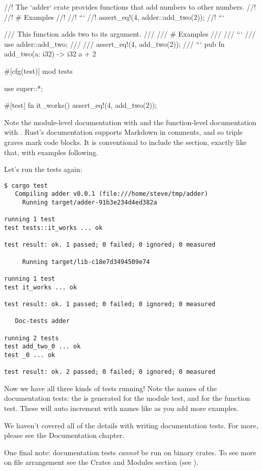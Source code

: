 \begin{rustc}
//! The `adder` crate provides functions that add numbers to other numbers.
//!
//! # Examples
//!
//! ```
//! assert_eq!(4, adder::add_two(2));
//! ```

/// This function adds two to its argument.
///
/// # Examples
///
/// ```
/// use adder::add_two;
///
/// assert_eq!(4, add_two(2));
/// ```
pub fn add_two(a: i32) -> i32 {
    a + 2
}

#[cfg(test)]
mod tests {
    use super::*;

    #[test]
    fn it_works() {
        assert_eq!(4, add_two(2));
    }
}
\end{rustc}

Note the module-level documentation with \code{//!} and the function-level documentation with \code{///}. Rust's documentation 
supports Markdown in comments, and so triple graves mark code blocks. It is conventional to include the  section, 
exactly like that, with examples following.

\blank

Let's run the tests again:

\begin{verbatim}
$ cargo test
   Compiling adder v0.0.1 (file:///home/steve/tmp/adder)
     Running target/adder-91b3e234d4ed382a

running 1 test
test tests::it_works ... ok

test result: ok. 1 passed; 0 failed; 0 ignored; 0 measured

     Running target/lib-c18e7d3494509e74

running 1 test
test it_works ... ok

test result: ok. 1 passed; 0 failed; 0 ignored; 0 measured

   Doc-tests adder

running 2 tests
test add_two_0 ... ok
test _0 ... ok

test result: ok. 2 passed; 0 failed; 0 ignored; 0 measured
\end{verbatim}

Now we have all three kinds of tests running! Note the names of the documentation tests: the  is generated for the module 
test, and  for the function test. These will auto increment with names like  as you add more examples.

\blank

We haven’t covered all of the details with writing documentation tests. For more, please see the Documentation chapter.

\blank

One final note: documentation tests \emph{cannot} be run on binary crates. To see more on file arrangement see the Crates and Modules section
(see ).
